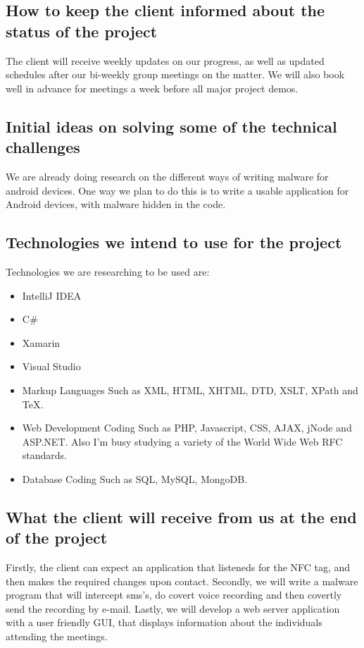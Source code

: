 \documentclass[12pt, oneside]{article}
\begin{document}
	\subsection{How to keep the client informed about the status of the project}
		The client will receive weekly updates on our progress, as well as updated schedules after our bi-weekly group meetings on the matter.
		We will also book well in advance for meetings a week before all major project demos.
		
	\subsection{Initial ideas on solving some of the technical challenges}
		We are already doing research on the different ways of writing malware for android devices.
		One way we plan to do this is to write a usable application for Android devices, with malware hidden in the code.

	\subsection{Technologies we intend to use for the project}
		Technologies we are researching to be used are:
		\begin{itemize}
								\item IntelliJ IDEA\newline
								\item C#\newline
								\item Xamarin\newline
								\item Visual Studio\newline
								\item Markup Languages\newline
									Such as XML, HTML, XHTML, DTD, XSLT, XPath and TeX.
								\item Web Development Coding\newline
									Such as PHP, Javascript, CSS, AJAX, jNode and ASP.NET. Also I'm busy studying a variety of the World Wide Web RFC standards.
								\item Database Coding\newline
									Such as SQL, MySQL, MongoDB.
								\end{itemize}	
	\subsection{What the client will receive from us at the end of the project}
		Firstly, the client can expect an application that listeneds for the NFC tag, and then makes the required changes upon contact.
		\newline
		Secondly, we will write a malware program that will intercept sms's, do covert voice recording and then covertly send the recording by e-mail.
		\newline
		Lastly, we will develop a web server application with a user friendly GUI, that displays information about the individuals attending the meetings.
\end{document}
